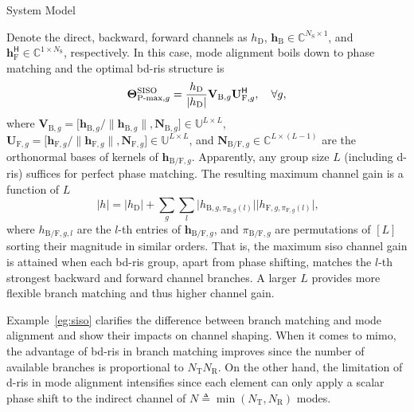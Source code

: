 \documentclass[journal]{IEEEtran}
\begin{document}
\begin{section}{System Model}
		\begin{example}
			\label{eg:siso}
			Denote the direct, backward, forward channels as $h_\mathrm{D}$, $\mathbf{h}_\mathrm{B} \in \mathbb{C}^{N_\mathrm{S} \times 1}$, and $\mathbf{h}_\mathrm{F}^\mathsf{H} \in \mathbb{C}^{1 \times N_\mathrm{S}}$, respectively.
			In this case, mode alignment boils down to phase matching and the optimal \gls{bd}-\gls{ris} structure is
			\begin{equation}
				\mathbf{\Theta}_{\textnormal{P-max},g}^\textnormal{SISO} = \frac{h_\mathrm{D}}{\lvert h_\mathrm{D} \rvert} \mathbf{V}_{\mathrm{B},g} \mathbf{U}_{\mathrm{F},g}^\mathsf{H}, \quad \forall g,
			\end{equation}
			where $\mathbf{V}_{\mathrm{B},g} = \bigl[\mathbf{h}_{\mathrm{B},g}/\lVert \mathbf{h}_{\mathrm{B},g} \rVert, \mathbf{N}_{\mathrm{B},g}\bigr] \in \mathbb{U}^{L \times L}$, $\mathbf{U}_{\mathrm{F},g} = \bigl[\mathbf{h}_{\mathrm{F},g}/\lVert \mathbf{h}_{\mathrm{F},g} \rVert, \mathbf{N}_{\mathrm{F},g}\bigr] \in \mathbb{U}^{L \times L}$, and $\mathbf{N}_{\mathrm{B/F},g} \in \mathbb{C}^{L \times (L-1)}$ are the orthonormal bases of kernels of $\mathbf{h}_{\mathrm{B/F},g}$.
			Apparently, any group size $L$ (including \gls{d}-\gls{ris}) suffices for perfect phase matching.
			The resulting maximum channel gain is a function of $L$
			\begin{equation}
				\ \lvert h \rvert = \lvert h_\mathrm{D} \rvert + \sum_g \sum_l \lvert h_{\mathrm{B},g,\pi_{\mathrm{B},g}(l)} \rvert \lvert h_{\mathrm{F},g,\pi_{\mathrm{F},g}(l)} \rvert,
			\end{equation}
			where $h_{\mathrm{B/F},g,l}$ are the $l$-th entries of $\mathbf{h}_{\mathrm{B/F},g}$, and $\pi_{\mathrm{B/F},g}$ are permutations of $[L]$ sorting their magnitude in similar orders.
			That is, the maximum \gls{siso} channel gain is attained when each \gls{bd}-\gls{ris} group, apart from phase shifting, matches the $l$-th strongest backward and forward channel branches.
			A larger $L$ provides more flexible branch matching and thus higher channel gain.
		\end{example}

		Example~\ref{eg:siso} clarifies the difference between branch matching and mode alignment and show their impacts on channel shaping.
		When it comes to \gls{mimo}, the advantage of \gls{bd}-\gls{ris} in branch matching improves since the number of available branches is proportional to $N_\mathrm{T} N_\mathrm{R}$. On the other hand, the limitation of \gls{d}-\gls{ris} in mode alignment intensifies since each element can only apply a scalar phase shift to the indirect channel of $N \triangleq \min(N_\mathrm{T}, N_\mathrm{R})$ modes.


\end{section}
\end{document}
